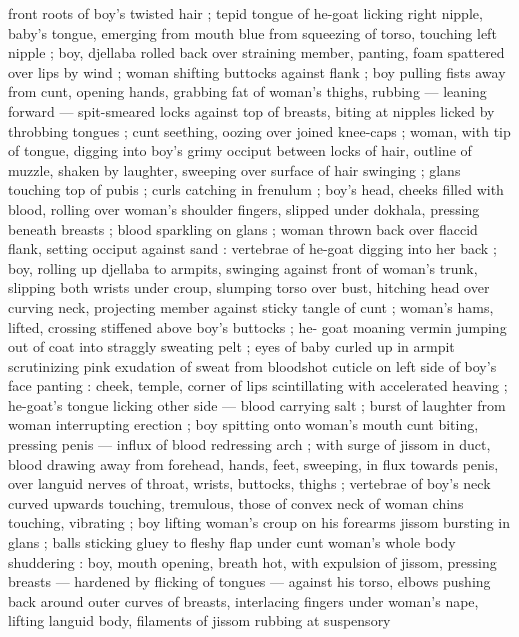 front roots of boy's twisted hair ; tepid tongue of he-goat licking 
right nipple, baby's tongue, emerging from mouth blue from 
squeezing of torso, touching left nipple ; boy, djellaba rolled back 
over straining member, panting, foam spattered over lips by wind ; 
woman shifting buttocks against flank ; boy pulling fists away from 
cunt, opening hands, grabbing fat of woman's thighs, rubbing --- 
leaning forward --- spit-smeared locks against top of breasts, biting 
at nipples licked by throbbing tongues ; cunt seething, oozing over 
joined knee-caps ; woman, with tip of tongue, digging into boy's 
grimy occiput between locks of hair, outline of muzzle, shaken by 
laughter, sweeping over surface of hair swinging ; glans touching top 
of pubis ; curls catching in frenulum ; boy's head, cheeks filled with 
blood, rolling over woman's shoulder {\col} fingers, slipped under 
dokhala, pressing beneath breasts ; blood sparkling on glans ; 
woman thrown back over flaccid flank, setting occiput against sand : 
vertebrae of he-goat digging into her back ; boy, rolling up djellaba 
to armpits, swinging against front of woman's trunk, slipping both 
wrists under croup, slumping torso over bust, hitching head over 
curving neck, projecting member against sticky tangle of cunt ; 
woman's hams, lifted, crossing stiffened above boy's buttocks ; he- 
goat moaning {\col} vermin jumping out of coat into straggly sweating 
pelt ; eyes of baby curled up in armpit scrutinizing pink exudation of 
sweat from bloodshot cuticle on left side of boy's face panting : 
cheek, temple, corner of lips scintillating with accelerated heaving ; 
he-goat's tongue licking other side --- blood carrying salt ; burst of 
laughter from woman interrupting erection ; boy spitting onto 
woman's mouth {\col} cunt biting, pressing penis --- influx of blood 
redressing arch ; with surge of jissom in duct, blood drawing away 
from forehead, hands, feet, sweeping, in flux towards penis, over 
languid nerves of throat, wrists, buttocks, thighs ; vertebrae of boy's 
neck curved upwards touching, tremulous, those of convex neck of 
woman {\col} chins touching, vibrating ; boy lifting woman's croup on his 
forearms {\col} jissom bursting in glans ; balls sticking gluey to fleshy flap 
under cunt {\col} woman's whole body shuddering : boy, mouth opening, 
breath hot, with expulsion of jissom, pressing breasts --- hardened 
by flicking of tongues --- against his torso, elbows pushing back 
around outer curves of breasts, interlacing fingers under woman's 
nape, lifting languid body, filaments of jissom rubbing at suspensory 
